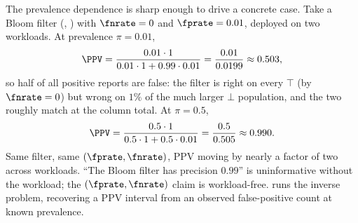 The prevalence dependence is sharp enough to drive a concrete case. Take a
Bloom filter (, ) with
$\fnrate = 0$ and $\fprate = 0.01$, deployed on two workloads. At prevalence
$\pi = 0.01$,
\[
  \PPV = \frac{0.01 \cdot 1}{0.01 \cdot 1 + 0.99 \cdot 0.01} = \frac{0.01}{0.0199}
  \approx 0.503,
\]
so half of all positive reports are false: the filter is right on every
$\top$ (by $\fnrate = 0$) but wrong on $1\%$ of the much larger $\bot$
population, and the two roughly match at the column total. At $\pi = 0.5$,
\[
  \PPV = \frac{0.5 \cdot 1}{0.5 \cdot 1 + 0.5 \cdot 0.01} = \frac{0.5}{0.505}
  \approx 0.990.
\]
Same filter, same $(\fprate, \fnrate)$, PPV moving by nearly a factor of two
across workloads. ``The Bloom filter has precision $0.99$'' is uninformative
without the workload; the $(\fprate, \fnrate)$ claim is workload-free.
 runs the inverse problem, recovering a PPV
interval from an observed false-positive count at known prevalence.
